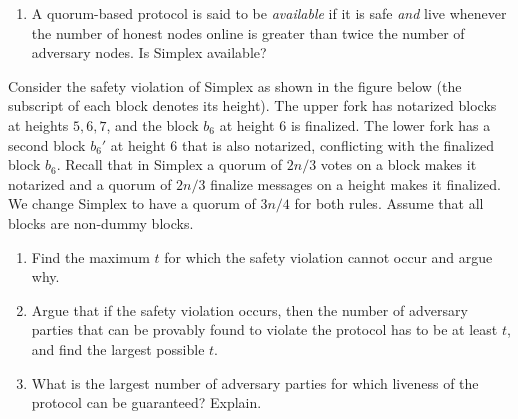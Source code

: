 \begin{problems}
\begin{enumerate}
\begin{enumerate}
                        rate of the longest notarized chain.
                \item Compute a lower bound on the expected growth rate of
                        the finalized chain. (Your lower bound does not need to be tight.
                        However if the lower bound is not tight, it must be positive.)
                \item Is the protocol safe? Is the protocol live?
                \end{enumerate}
            \item A quorum-based protocol is said to be {\em available} if it
                is safe \emph{and} live whenever the number of honest nodes online is
                greater than twice the number of adversary nodes. Is Simplex available?
        \end{enumerate}
    
        \item Consider the safety violation of Simplex as shown in the figure below (the
            subscript of each block denotes its height). The upper fork has notarized blocks
            at heights $5,6,7$, and the block $b_6$ at height $6$ is finalized. The lower
            fork has a second block $b_6'$ at height $6$ that is also notarized, conflicting
            with the finalized block $b_6$. Recall that in Simplex a quorum of $2n/3$ votes
            on a block makes it notarized and a quorum of $2n/3$ finalize messages on a
            height makes it finalized. We change Simplex to have a quorum of $3n/4$ for
            both rules. Assume that all blocks are non-dummy blocks.
            \begin{enumerate}
                \item Find the maximum $t$ for which the safety violation cannot occur and
                    argue why.
                \item Argue that if the safety violation occurs, then the number of
                    adversary parties that can be provably found to violate the protocol has
                    to be at least $t$, and find the largest possible $t$.
                \item What is the largest number of adversary parties for which liveness of
                    the protocol can be guaranteed? Explain.
            \end{enumerate}


\end{problems}

